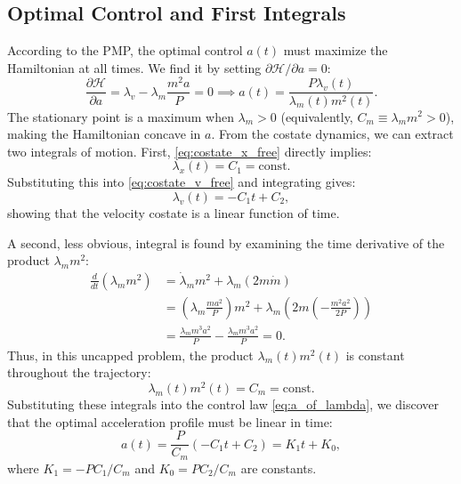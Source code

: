 \documentclass[journal,a4paper]{IEEEtran}
\begin{document}
\subsection{Optimal Control and First Integrals}
According to the PMP, the optimal control $a(t)$ must maximize the Hamiltonian at all times. We find it by setting $\partial\mathcal{H}/\partial a = 0$:
\begin{equation}
    \frac{\partial\mathcal{H}}{\partial a} = \lambda_v - \lambda_m \frac{m^2 a}{P} = 0 \implies a(t) = \frac{P \lambda_v(t)}{\lambda_m(t) m^2(t)}.
    \label{eq:a_of_lambda}
\end{equation}
The stationary point is a maximum when \(\lambda_m>0\) (equivalently, \(C_m\equiv\lambda_m m^2>0\)), making the Hamiltonian concave in \(a\). From the costate dynamics, we can extract two integrals of motion. First, \eqref{eq:costate_x_free} directly implies:
\begin{equation}
    \lambda_x(t) = C_1 = \text{const}.
\end{equation}
Substituting this into \eqref{eq:costate_v_free} and integrating gives:
\begin{equation}
    \lambda_v(t) = -C_1 t + C_2,
\end{equation}
showing that the velocity costate is a linear function of time.

A second, less obvious, integral is found by examining the time derivative of the product $\lambda_m m^2$:
\begin{align}
    \frac{d}{dt}(\lambda_m m^2) &= \dot\lambda_m m^2 + \lambda_m (2m \dot m) \nonumber\\
    &= \left(\lambda_m \frac{m a^2}{P}\right) m^2 + \lambda_m \left(2m \left(-\frac{m^2 a^2}{2P}\right)\right) \nonumber\\
    &= \frac{\lambda_m m^3 a^2}{P} - \frac{\lambda_m m^3 a^2}{P} = 0.
\end{align}
Thus, in this uncapped problem, the product $\lambda_m(t) m^2(t)$ is constant throughout the trajectory:
\begin{equation}
    \lambda_m(t) m^2(t) = C_m = \text{const}.
    \label{eq:mass_costate_integral}
\end{equation}
Substituting these integrals into the control law \eqref{eq:a_of_lambda}, we discover that the optimal acceleration profile must be linear in time:
\begin{equation}
    a(t) = \frac{P}{C_m}(-C_1 t + C_2) = K_1 t + K_0,
\end{equation}
where $K_1 = -PC_1/C_m$ and $K_0 = PC_2/C_m$ are constants.
\end{document}
